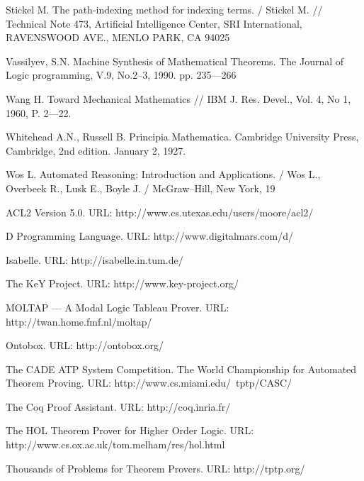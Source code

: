 \begin{thebibliography}{99}
 Stickel M. The path-indexing method for indexing terms. / Stickel M. // Technical Note 473, Artificial Intelligence Center, SRI International, RAVENSWOOD AVE., MENLO PARK, CA 94025

 Vassilyev, S.N. Machine Synthesis of Mathematical Theorems. The Journal of Logic programming, V.9, No.2--3, 1990. pp. 235---266

 Wang H. Toward Mechanical Mathematics // IBM J. Res. Devel., Vol. 4, No 1, 1960, P. 2---22.

 Whitehead A.N., Russell B. Principia Mathematica. Cambridge University Press, Cambridge, 2nd edition. January 2, 1927.

 Wos L. Automated Reasoning: Introduction and Applications. / Wos L., Overbeek R., Lusk E.,  Boyle J. / McGraw--Hill,  New York, 19


 ACL2 Version 5.0. URL: http://www.cs.utexas.edu/users/moore/acl2/

 D Programming Language. URL: http://www.digitalmars.com/d/

 Isabelle. URL: http://isabelle.in.tum.de/

 The KeY Project. URL: http://www.key-project.org/

 MOLTAP — A Modal Logic Tableau Prover. URL: http://twan.home.fmf.nl/moltap/

 Ontobox. URL: http://ontobox.org/

 The CADE ATP System Competition. The World Championship for Automated Theorem Proving. URL: http://www.cs.miami.edu/~tptp/CASC/

 The Coq Proof Assistant. URL: http://coq.inria.fr/

 The HOL Theorem Prover for Higher Order Logic. URL: http://www.cs.ox.ac.uk/tom.melham/res/hol.html

 Thousands of Problems for Theorem Provers. URL: http://tptp.org/









\end{thebibliography}



